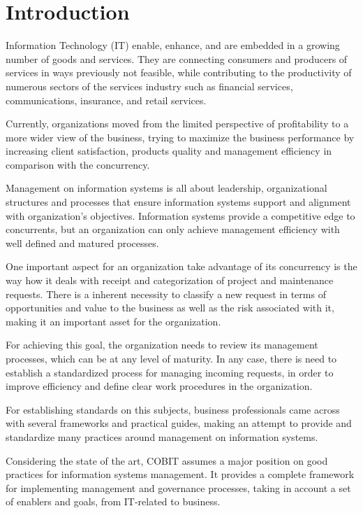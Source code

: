 
% 
% 

\section{Introduction}

Information Technology (IT) enable, enhance, and are embedded in a growing number of goods and services. They are connecting consumers and producers of services in ways previously not feasible, while contributing to the productivity of numerous sectors of the services industry such as financial services, communications, insurance, and retail services.\par
Currently, organizations moved from the limited perspective of profitability to a more wider view of the business, trying to maximize the business performance by increasing client satisfaction, products quality and management efficiency in comparison with the concurrency.\par
Management on information systems is all about leadership, organizational structures and processes that ensure information systems support and alignment with organization's objectives. Information systems provide a competitive edge to concurrents, but an organization can only achieve management efficiency with well defined and matured processes. \par
One important aspect for an organization take advantage of its concurrency is the way how it deals with receipt and categorization of project and maintenance requests. There is a inherent necessity to classify a new request in terms of opportunities  and value to the business as well as the risk associated with it, making it an important asset for the organization.\par
For achieving this goal, the organization needs to review its management processes, which can be at any level of maturity. In any case, there is need to establish a standardized process for managing incoming requests, in order to improve efficiency and define clear work procedures in the organization.\par
For establishing standards on this subjects, business professionals came across with several frameworks and practical guides, making an attempt to provide and standardize many practices around management on information systems.\par
Considering the state of the art, COBIT assumes a major position on good practices for information systems management. It provides a complete framework for implementing management and governance processes, taking in account a set of enablers and goals, from IT-related to business.\par
